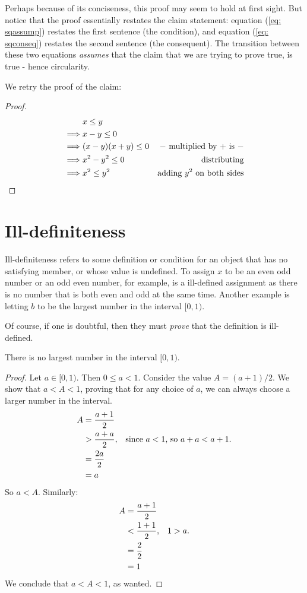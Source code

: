 \documentclass[../proofs.tex]{subfiles}
\begin{document}
Perhaps because of its conciseness, this proof may seem to hold at first sight.
But notice that the proof essentially restates the claim statement: equation
(\ref{eq: sqassump}) restates the first sentence (the condition), and equation
(\ref{eq: sqconseq}) restates the second sentence (the consequent). The
transition between these two equations \emph{assumes} that the claim that we
are trying to prove true, is true - hence circularity.

We retry the proof of the claim:
\begin{proof}
  \begin{align}
    &x \leq y \\
    \implies &x - y \leq 0 \\
    \implies &(x - y)(x + y) \leq 0
      & \text{$-$ multiplied by $+$ is $-$} \\
    \implies &x^2 - y^2 \leq 0 & \text{distributing} \\
    \implies &x^2 \leq y^2 & \text{adding $y^2$ on both sides}
  \end{align}
\end{proof}

\section{Ill-definiteness}
Ill-definiteness refers to some definition or condition for an object that has
no satisfying member, or whose value is undefined. To assign $x$ to be an even
odd number or an odd even number, for example, is a ill-defined assignment as
there is no number that is both even and odd at the same time. Another example
is letting $b$ to be the largest number in the interval $[0, 1)$.

Of course, if one is doubtful, then they must \emph{prove} that the definition
is ill-defined.

\begin{expl}{\label{badproofs: expl: openlargest}
   There is no largest number in the interval $[0, 1)$.}

  \begin{proof}
    Let $a \in [0, 1)$. Then $0 \leq a < 1$. Consider the value
    $A = (a + 1) / 2$. We show that $a < A < 1$, proving that for any choice of
    $a$, we can always choose a larger number in the interval.
    \begin{align}
      A &= \frac{a+1}{2} \\
        &> \frac{a + a}{2}, & \text{since $a < 1$, so $a+a < a+1$.} \\
        &= \frac{2a}{2} \\
        &= a
    \end{align}
    So $a < A$. Similarly:
    \begin{align}
      A &= \frac{a + 1}{2} \\
        &< \frac{1 + 1}{2}, & \text{$1 > a$.} \\
        &= \frac{2}{2} \\
        &= 1
    \end{align}
    We conclude that $a < A < 1$, as wanted.
  \end{proof}
\end{expl}
\end{document}
